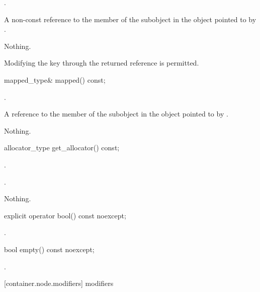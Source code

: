 \begin{itemdescr}
\pnum
\requires {}.

\pnum
\returns A non-const reference to the  member of the
 subobject in the  object
pointed to by .

\pnum
\throws  Nothing.

\pnum
\remarks Modifying the key through the returned reference is permitted.
\end{itemdescr}

\begin{itemdecl}
mapped_type& mapped() const;
\end{itemdecl}

\begin{itemdescr}
\pnum
\requires {}.

\pnum
\returns A reference to the  member of the
 subobject in the  object
pointed to by .

\pnum
\throws  Nothing.
\end{itemdescr}


\begin{itemdecl}
allocator_type get_allocator() const;
\end{itemdecl}

\begin{itemdescr}
\pnum
\requires {}.

\pnum
\returns {}.

\pnum
\throws Nothing.
\end{itemdescr}

\begin{itemdecl}
explicit operator bool() const noexcept;
\end{itemdecl}

\begin{itemdescr}
\pnum
\returns {}.
\end{itemdescr}

\begin{itemdecl}
bool empty() const noexcept;
\end{itemdecl}

\begin{itemdescr}
\pnum
\returns {}.
\end{itemdescr}

[container.node.modifiers]{ modifiers}

